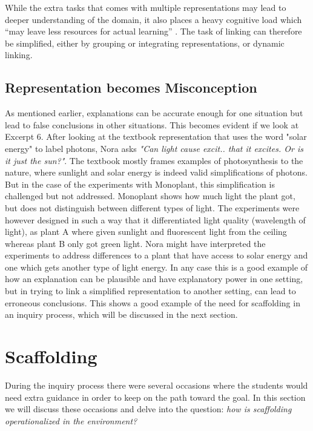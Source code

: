 While the extra tasks that comes with multiple representations may lead to deeper understanding of the domain, it also places a heavy cognitive load which “may leave less resources for actual learning” \citetext{Sweller, 1988, 1989, referenced in \citealp{van2006supporting}}. The task of linking can therefore be simplified, either by grouping or integrating representations, or dynamic linking. 

\subsection{Representation becomes Misconception}
As mentioned earlier, explanations can be accurate enough for one situation but lead to false conclusions in other situations. \citep{smith1994misconceptions} This becomes evident if we look at Excerpt 6. After looking at the textbook representation that uses the word "solar energy" to label photons, Nora asks \emph{"Can light cause excit.. that it excites. Or is it just the sun?"}. The textbook mostly frames examples of photosynthesis to the nature, where sunlight and solar energy is indeed valid simplifications of photons. But in the case of the experiments with Monoplant, this simplification is challenged but not addressed. Monoplant shows how much light the plant got, but does not distinguish between different types of light. The experiments were however designed in such a way that it differentiated light quality (wavelength of light), as plant A where given sunlight and fluorescent light from the ceiling whereas plant B only got green light. Nora might have interpreted the experiments to address differences to a plant that have access to solar energy and one which gets another type of light energy. In any case this is a good example of how an explanation can be plausible and have explanatory power in one setting, but in trying to link a simplified representation to another  setting, can lead to erroneous conclusions. This shows a good example of the need for scaffolding in an inquiry process, which will be discussed in the next section.



\section{Scaffolding}
During the inquiry process there were several occasions where the students would need extra guidance in order to keep on the path toward the goal. In this section we will discuss these occasions and delve into the question: \emph{how is scaffolding operationalized in the environment?}


